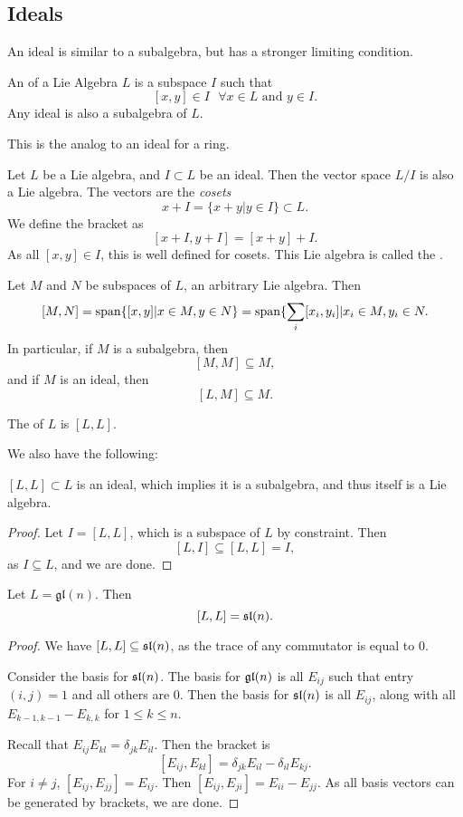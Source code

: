 \subsection{Ideals}
An ideal is similar to a subalgebra, but has a stronger limiting condition. 
\begin{definition}
An  of a Lie Algebra $L$ is a subspace $I$ such that 
\[ [x,y] \in I \text{ }\forall x\in L \text{ and } y \in I. \] 
Any ideal is also a subalgebra of $L$. 
\end{definition}
This is the analog to an ideal for a ring. 

\begin{example}
Let $L$ be a Lie algebra, and $I \subset L$ be an ideal. Then the vector space $L/I$ is also a Lie algebra. The vectors are the \emph{cosets} 
\[ x + I = \{x+y | y \in I \} \subset L. \] We define the bracket as 
\[ [x+I, y+I] = [x+y] + I. \] As all $[x,y] \in I$, this is well defined for cosets. This Lie algebra is called the .  
\end{example}

Let $M$ and $N$ be subspaces of $L$, an arbitrary Lie algebra. Then 
\[ [M,N] = \operatorname{span}\{[x,y] | x \in M, y \in N\} = \operatorname{span} \{\sum_{i} [x_i,y_i] | x_i \in M, y_i \in N. \] 
In particular, if $M$ is a subalgebra, then 
\[ [M,M] \subseteq M, \] and if $M$ is an ideal, then \[ [L,M] \subseteq M. \] 

\begin{definition}
The  of $L$ is $[L,L]$. 
\end{definition}

We also have the following: 
\begin{lemma*}
$[L,L] \subset L$ is an ideal, which implies it is a subalgebra, and thus itself is a Lie algebra. 
\end{lemma*}
\begin{proof}
Let $I = [L,L]$, which is a subspace of $L$ by constraint. Then 
\[ [L,I] \subseteq [L,L] = I, \] as $I \subseteq L$, and we are done. 
\end{proof}

\begin{lemma*}
Let $L = \mathfrak{gl}(n)$. Then 
\[ [L,L] = \frak{sl}(n). \] 
\end{lemma*}
\begin{proof}
We have $[L,L] \subseteq \frak{sl}(n)$, as the trace of any commutator is equal to 0. \newline

Consider the basis for $\frak{sl}(n)$. The basis for $\frak{gl}(n)$ is all $E_{ij}$ such that entry $(i,j) = 1$ and all others are 0. Then the basis for $\frak{sl}(n)$ is all $E_{ij}$, along with all $E_{k-1,k-1} - E_{k,k}$ for $1 \leq k \leq n$. \newline


Recall that $E_{ij}E_{kl} = \delta_{jk}E_{il}$. Then the bracket is 
\[ [E_{ij}, E_{kl}] = \delta_{jk}E_{il} - \delta_{il}E_{kj}. \] For $i \neq j$, $[E_{ij}, E_{jj}] = E_{ij}$. Then $[E_{ij}, E_{ji}] = E_{ii} - E_{jj}$. As all basis vectors can be generated by brackets, we are done. 
\end{proof}

